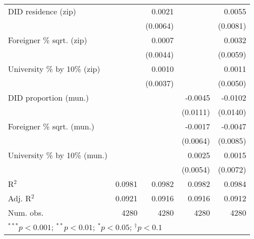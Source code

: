 \begin{tabular}{l D{.}{.}{4.11} D{.}{.}{4.11} D{.}{.}{4.11} D{.}{.}{4.11}}
DID residence (zip)               &                  & 0.0021           &                  & 0.0055           \\
                                  &                  & (0.0064)         &                  & (0.0081)         \\
Foreigner \% sqrt. (zip)          &                  & 0.0007           &                  & 0.0032           \\
                                  &                  & (0.0044)         &                  & (0.0059)         \\
University \% by 10\% (zip)       &                  & 0.0010           &                  & 0.0011           \\
                                  &                  & (0.0037)         &                  & (0.0050)         \\
DID proportion (mun.)             &                  &                  & -0.0045          & -0.0102          \\
                                  &                  &                  & (0.0111)         & (0.0140)         \\
Foreigner \% sqrt. (mun.)         &                  &                  & -0.0017          & -0.0047          \\
                                  &                  &                  & (0.0064)         & (0.0085)         \\
University \% by 10\% (mun.)      &                  &                  & 0.0025           & 0.0015           \\
                                  &                  &                  & (0.0054)         & (0.0072)         \\
\midrule
R$^2$                             & 0.0981           & 0.0982           & 0.0982           & 0.0984           \\
Adj. R$^2$                        & 0.0921           & 0.0916           & 0.0916           & 0.0912           \\
Num. obs.                         & 4280             & 4280             & 4280             & 4280             \\
\bottomrule
{}
\end{tabular}
